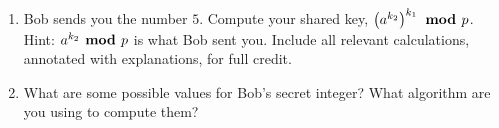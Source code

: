 \begin{enumerate}[labelindent=0pt, leftmargin=0pt]
\begin{enumerate}
        \item  Bob sends you the number $5$. Compute  your shared key, $\left(a^{k_2}\right)^{k_1}  
        \textrm{\bf ~mod~} p$.
        Hint: $a^{k_2} \textrm{\bf ~mod~} p$ is what Bob sent you.  Include all relevant calculations, annotated with explanations, 
        for full credit.
        
        
        \item What are some possible values for Bob's secret integer?  What 
        algorithm are you using to compute them?
        \end{enumerate}


    \end{enumerate}

